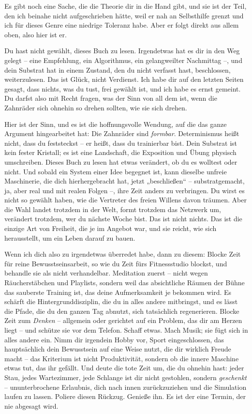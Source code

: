 \documentclass[11pt, twoside, openright]{book}
\begin{document}
Es gibt noch eine Sache, die die Theorie dir in die Hand gibt, und sie ist der Teil, den ich beinahe nicht aufgeschrieben hätte, weil er nah an Selbsthilfe grenzt und ich für dieses Genre eine niedrige Toleranz habe. Aber er folgt direkt aus allem oben, also hier ist er.

Du hast nicht gewählt, dieses Buch zu lesen. Irgendetwas hat es dir in den Weg gelegt -- eine Empfehlung, ein Algorithmus, ein gelangweilter Nachmittag --, und dein Substrat hat in einem Zustand, den du nicht verfasst hast, beschlossen, weiterzulesen. Das ist Glück, nicht Verdienst. Ich habe dir auf den letzten Seiten gesagt, dass nichts, was du tust, frei gewählt ist, und ich habe es ernst gemeint. Du darfst also mit Recht fragen, was der Sinn von all dem ist, wenn die Zahnräder sich ohnehin so drehen sollten, wie sie sich drehen.

Hier ist der Sinn, und es ist die hoffnungsvolle Wendung, auf die das ganze Argument hingearbeitet hat: Die Zahnräder sind \textit{formbar}. Determinismus heißt nicht, dass du feststeckst -- er heißt, dass du trainierbar bist. Dein Substrat ist kein fester Kristall; es ist eine Landschaft, die Exposition und Übung physisch umschreiben. Dieses Buch zu lesen hat etwas verändert, ob du es wolltest oder nicht. Und sobald ein System einer Idee begegnet ist, kann dieselbe unfreie Maschinerie, die dich hierhergebracht hat, jetzt „beschließen“ -- substratgemacht, ja, aber real und mit realen Folgen --, ihre Zeit anders zu verbringen. Du wirst es nicht so gewählt haben, wie die Vertreter des freien Willens davon träumen. Aber die Wahl landet trotzdem in der Welt, formt trotzdem das Netzwerk um, verändert trotzdem, wer du nächste Woche bist. Das ist nicht nichts. Das ist die einzige Art von Freiheit, die je im Angebot war, und sie reicht, wie sich herausstellt, um ein Leben darauf zu bauen.

Wenn ich dich also zu irgendetwas überredet habe, dann zu diesem: Blocke Zeit für reine Bewusstseinsarbeit, so wie du Zeit fürs Fitnessstudio blockst, und behandle sie als nicht verhandelbar. Meditation zuerst -- nicht wegen Räucherstäbchen und Playlists, sondern weil das absichtliche Räumen der Bühne das sauberste Training ist, das deine Aufmerksamkeit je bekommen wird. Es schärft die Hintergrunddisziplin, die du in alles andere mitbringst, und es lässt die Pfade, die du den ganzen Tag abnutzt, sich tatsächlich regenerieren. Blocke Zeit zum \textit{Denken} -- allgemein oder gerichtet auf ein Problem, das dir am Herzen liegt -- und schütze sie vor dem Telefon. Schaff etwas. Mach Musik; sie fügt sich in alles andere ein. Nimm dir irgendein Hobby vor, Sport eingeschlossen, das hauptsächlich dein Bewusstsein auf eine Weise nutzt, die dir wirklich Freude macht -- das Kriterium ist nicht Produktivität, sondern ob die innere Maschine etwas tut, das ihr gefällt. Und deute die tote Zeit um, die du ohnehin hast: jeder Stau, jedes Wartezimmer, jede Schlange ist dir nicht gestohlen, sondern \textit{geschenkt} -- ununterbrochene Erlaubnis, dich nach innen zurückzuziehen und die Simulation laufen zu lassen. Poliere diesen Rückzug. Genieße ihn. Es ist der eine Termin, der nie abgesagt wird.
\end{document}
